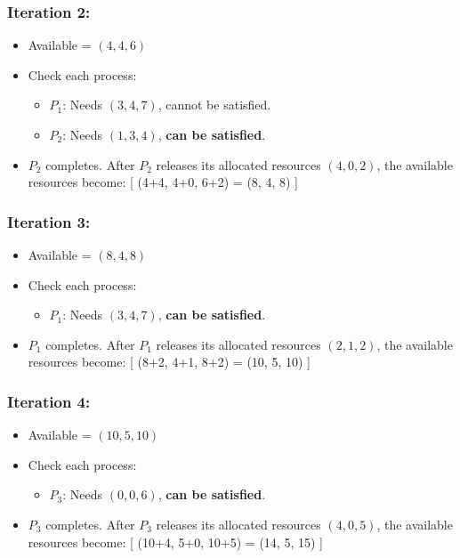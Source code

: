 \documentclass[a4paper]{book}
\begin{document}
\subsubsection{Iteration 2:}
\begin{itemize}
\item 
Available = \( (4, 4, 6) \)

\item 
Check each process:
\begin{itemize}
\item 
\( P_1 \): Needs \( (3, 4, 7) \), cannot be satisfied.

\item 
\( P_2 \): Needs \( (1, 3, 4) \), \textbf{can be satisfied}.

\end{itemize}

\item 
\( P_2 \) completes. After \( P_2 \) releases its allocated resources \( (4, 0, 2) \), the available resources become:
[
(4+4, 4+0, 6+2) = (8, 4, 8)
]

\end{itemize}

\subsubsection{Iteration 3:}
\begin{itemize}
\item 
Available = \( (8, 4, 8) \)

\item 
Check each process:
\begin{itemize}
\item 
\( P_1 \): Needs \( (3, 4, 7) \), \textbf{can be satisfied}.

\end{itemize}

\item 
\( P_1 \) completes. After \( P_1 \) releases its allocated resources \( (2, 1, 2) \), the available resources become:
[
(8+2, 4+1, 8+2) = (10, 5, 10)
]

\end{itemize}

\subsubsection{Iteration 4:}
\begin{itemize}
\item 
Available = \( (10, 5, 10) \)

\item 
Check each process:
\begin{itemize}
\item 
\( P_3 \): Needs \( (0, 0, 6) \), \textbf{can be satisfied}.

\end{itemize}

\item 
\( P_3 \) completes. After \( P_3 \) releases its allocated resources \( (4, 0, 5) \), the available resources become:
[
(10+4, 5+0, 10+5) = (14, 5, 15)
]

\end{itemize}
\end{document}
